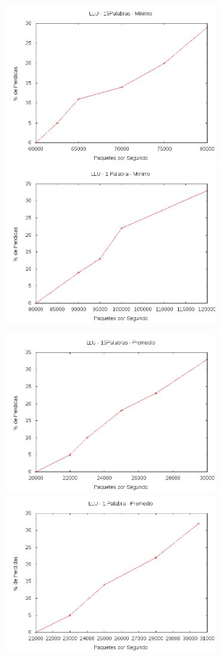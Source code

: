 \documentclass[12pt,spanish]{article}
\begin{document}
\begin{center}
\includegraphics[width=0.7\textwidth]{graf/llu15pmin.png}
\includegraphics[width=0.7\textwidth]{graf/llu1pmin.png}

\includegraphics[width=0.7\textwidth]{graf/llu15pprom.png}
\includegraphics[width=0.7\textwidth]{graf/llu1pprom.png}
	

\end{center}
\end{document}
